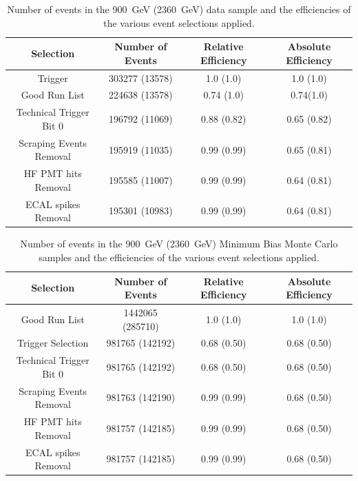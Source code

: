 \begin{table}[!ht]
  \begin{center}
    \begin{tabular}{|c|c|c|c|}
      \hline
      Selection      & Number of Events  & Relative Efficiency   &
      Absolute Efficiency\\
      \hline\hline
      Trigger                            & 303277 (13578) & 1.0 (1.0)&1.0 (1.0) \\ 
      Good Run List                 & 224638 (13578) & 0.74 (1.0) & 0.74(1.0)  \\
      Technical Trigger Bit 0    & 196792 (11069) & 0.88 (0.82) & 0.65 (0.82)\\
      Scraping Events Removal& 195919 (11035) & 0.99 (0.99) & 0.65 (0.81) \\
      HF PMT hits Removal      & 195585 (11007) & 0.99 (0.99) & 0.64 (0.81)\\
      ECAL spikes Removal     & 195301 (10983) & 0.99 (0.99) & 0.64 (0.81) \\ \hline
  \end{tabular}
    \caption{Number of events in the 900~GeV (2360~GeV) data sample and
      the efficiencies of the various event selections applied.}
    \label{tab:selectionefficiency_1}
  \end{center}
\end{table}

\begin{table}[!ht]
  \begin{center}
    \begin{tabular}{|c|c|c|c|}
      \hline
      Selection      & Number of Events  & Relative Efficiency   &
      Absolute Efficiency\\
      \hline\hline
      Good Run List                 & 1442065 (285710) & 1.0 (1.0) & 1.0 (1.0)  \\
      Trigger Selection             & 981765 (142192) & 0.68 (0.50)& 0.68 (0.50) \\ 
      Technical Trigger Bit 0    & 981765 (142192) & 0.68 (0.50) & 0.68 (0.50)\\
      Scraping Events Removal& 981763 (142190) & 0.99 (0.99) & 0.68 (0.50) \\
      HF PMT hits Removal      & 981757 (142185) & 0.99 (0.99) & 0.68 (0.50)\\
      ECAL spikes Removal     & 981757 (142185) & 0.99 (0.99) & 0.68 (0.50) \\ \hline
    \end{tabular}
    \caption{Number of events in the 900~GeV (2360~GeV) Minimum Bias
      Monte Carlo samples and the efficiencies of the various event
      selections applied.}
    \label{tab:{tab:selectionefficiency_2}}
  \end{center}
\end{table}


